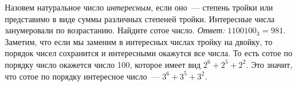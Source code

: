 \problem
Назовем натуральное число \emph{интересным}, если оно~--- степень тройки или
представимо в виде суммы различных степеней тройки.
Интересные числа занумеровали по возрастанию.
Найдите сотое число.
\solution
\emph{Ответ:} $1100100_3 = 981$.
Заметим, что если мы заменим в интересных числах тройку на двойку, то порядок
чисел сохранится и интересными окажутся все числа.
То есть сотое по порядку число окажется число 100, которое имеет вид
$2^{6} + 2^{5} + 2^{2}$.
Это значит, что сотое по порядку интересное число~--- $3^6 + 3^5 + 3^2$.
\endproblem
